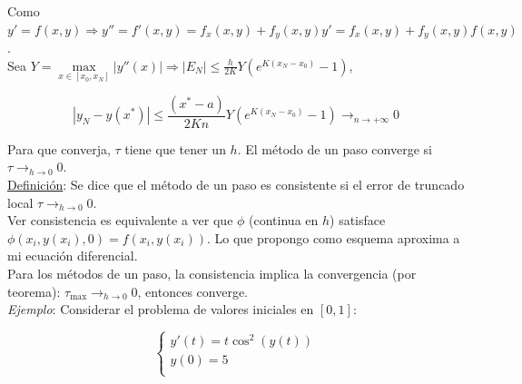 Como $y' = f(x, y) \Rightarrow y'' = f'(x, y) = f_{x}(x, y) + f_{y}(x, y)y' = f_{x}(x, y) + f_{y}(x, y)f(x, y)$.\\

Sea $Y = \max \limits_{x \in [x_{0}, x_{N}]} |y''(x)| \Rightarrow |E_{N}| \leq \frac{h}{2K}Y(e^{K(x_{N} - x_{0})} - 1)$,

$$|y_{N} - y(x^{*})| \leq \frac{(x^{*} - a)}{2Kn}Y(e^{K(x_{N} - x_{0})} - 1) \rightarrow_{n \rightarrow +\infty} 0$$

Para que converja, $\tau$ tiene que tener un $h$. El m\'etodo de un paso converge si $\tau \rightarrow_{h \rightarrow 0} 0$.\\

\underline{Definici\'on}: Se dice que el m\'etodo de un paso es consistente si el error de truncado local $\tau \rightarrow_{h \rightarrow 0} 0$.\\

Ver consistencia es equivalente a ver que $\phi$ (continua en $h$) satisface $\phi(x_{i}, y(x_{i}), 0) = f(x_{i}, y(x_{i}))$. Lo que propongo como esquema aproxima a mi ecuaci\'on diferencial.\\

Para los m\'etodos de un paso, la consistencia implica la convergencia (por teorema): $\tau_{\max} \rightarrow_{h \rightarrow 0} 0$, entonces converge.\\

\textit{Ejemplo}: Considerar el problema de valores iniciales en $[0, 1]$:

$$ 
	\begin{cases}
        y'(t) = t\cos^{2}(y(t))\\
        y(0) = 5\\
    \end{cases}
$$

